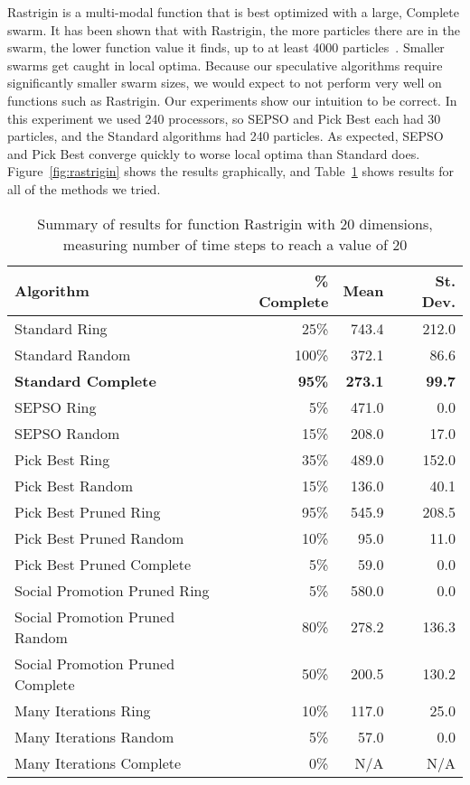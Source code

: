 \documentclass[smallcondensed]{svjour3}
\newcommand{\fig}[1]{Figure~\ref{fig:#1}}
\newcommand{\tabref}[1]{Table~\ref{tab:#1}}
\begin{document}
Rastrigin is a multi-modal function that is best optimized with a large,
Complete swarm.  It has been shown that with Rastrigin, the more particles
there are in the swarm, the lower function value it finds, up to at least 4000
particles~\citep{mcnabb-2009-large-particle-swarms}.  Smaller swarms get caught
in local optima.  Because our speculative algorithms require significantly
smaller swarm sizes, we would expect to not perform very well on functions such
as Rastrigin.  Our experiments show our intuition to be correct.  In this
experiment we used 240 processors, so SEPSO and Pick Best each had 30
particles, and the Standard algorithms had 240 particles.  As expected, SEPSO
and Pick Best converge quickly to worse local optima than Standard does.
\fig{rastrigin} shows the results graphically, and \tabref{rastrigin-20} shows
results for all of the methods we tried.

\begin{table}
  \caption{Summary of results for function Rastrigin with 20 dimensions,
  measuring number of time steps to reach a value of 20}
  \label{tab:rastrigin-20}
  \centering
  \begin{tabular}{|l|r|r|r|}
  \hline
  Algorithm&\% Complete&Mean&St. Dev.\\
  \hline
  \hline
  Standard Ring&25\%&743.4&212.0\\
  \hline
  Standard Random&100\%&372.1&86.6\\
  \hline
  \textbf{Standard Complete}&\textbf{95\%}&\textbf{273.1}&\textbf{99.7}\\
  \hline
  SEPSO Ring&5\%&471.0&0.0\\
  \hline
  SEPSO Random&15\%&208.0&17.0\\
  \hline
  Pick Best Ring&35\%&489.0&152.0\\
  \hline
  Pick Best Random&15\%&136.0&40.1\\
  \hline
  Pick Best Pruned Ring&95\%&545.9&208.5\\
  \hline
  Pick Best Pruned Random&10\%&95.0&11.0\\
  \hline
  Pick Best Pruned Complete&5\%&59.0&0.0\\
  \hline
  Social Promotion Pruned Ring&5\%&580.0&0.0\\
  \hline
  Social Promotion Pruned Random&80\%&278.2&136.3\\
  \hline
  Social Promotion Pruned Complete&50\%&200.5&130.2\\
  \hline
  Many Iterations Ring&10\%&117.0&25.0\\
  \hline
  Many Iterations Random&5\%&57.0&0.0\\
  \hline
  Many Iterations Complete&0\%&N/A&N/A\\
  \hline
  \end{tabular}
\end{table}
\end{document}
